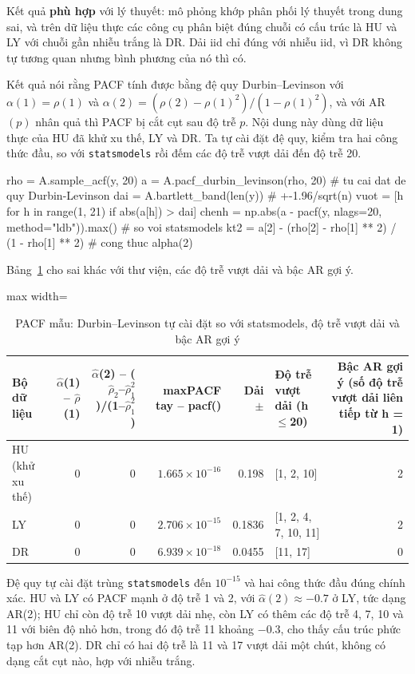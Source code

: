  Kết quả \textbf{phù hợp} với lý thuyết: mô phỏng khớp phân phối lý thuyết trong dung sai, và trên dữ liệu thực các công cụ phân biệt đúng chuỗi có cấu trúc là HU và LY với chuỗi gần nhiễu trắng là DR. Dải iid chỉ đúng với nhiễu iid, vì DR không tự tương quan nhưng bình phương của nó thì có.

 Kết quả  nói rằng PACF tính được bằng đệ quy Durbin--Levinson với $\alpha(1)=\rho(1)$ và $\alpha(2)=(\rho(2)-\rho(1)^2)/(1-\rho(1)^2)$, và với AR$(p)$ nhân quả thì PACF bị cắt cụt sau độ trễ $p$.
 Nội dung này dùng dữ liệu thực của HU đã khử xu thế, LY và DR. Ta tự cài đặt đệ quy, kiểm tra hai công thức đầu, so với \texttt{statsmodels} rồi đếm các độ trễ vượt dải đến độ trễ 20.
\begin{codeblock}
rho = A.sample_acf(y, 20)
a = A.pacf_durbin_levinson(rho, 20)            # tu cai dat de quy Durbin-Levinson
dai = A.bartlett_band(len(y))                  # +-1.96/sqrt(n)
vuot = [h for h in range(1, 21) if abs(a[h]) > dai]
chenh = np.abs(a - pacf(y, nlags=20, method="ldb")).max()    # so voi statsmodels
kt2 = a[2] - (rho[2] - rho[1] ** 2) / (1 - rho[1] ** 2)       # cong thuc alpha(2)
\end{codeblock}
 Bảng~\ref{tab:tab_b11_11_pacf} cho sai khác với thư viện, các độ trễ vượt dải và bậc AR gợi ý.
\begin{table}[H]
\centering\footnotesize
\caption{PACF mẫu: Durbin–Levinson tự cài đặt so với statsmodels, độ trễ vượt dải và bậc AR gợi ý}\label{tab:tab_b11_11_pacf}
\begin{adjustbox}{max width=\linewidth}
\begin{tabular}{|l|r|r|r|r|l|r|}
\toprule
Bộ dữ liệu & $\hat{\alpha}$(1) – $\hat{\rho}$(1) & $\hat{\alpha}$(2) – ($\hat{\rho}_{2}$–$\hat{\rho}_{1}^{2}$)/(1–$\hat{\rho}_{1}^{2}$) & max\textbar{}PACF tay – pacf()\textbar{} & Dải $\pm$ & Độ trễ vượt dải (h$\le$20) & Bậc AR gợi ý (số độ trễ vượt dải liên tiếp từ h = 1) \\
\midrule
HU (khử xu thế) & 0 & 0 & $1.665\times10^{-16}$ & 0.198 & [1, 2, 10] & 2 \\
LY & 0 & 0 & $2.706\times10^{-15}$ & 0.1836 & [1, 2, 4, 7, 10, 11] & 2 \\
DR & 0 & 0 & $6.939\times10^{-18}$ & 0.0455 & [11, 17] & 0 \\
\bottomrule
\end{tabular}
\end{adjustbox}
\end{table}
 Đệ quy tự cài đặt trùng \texttt{statsmodels} đến $10^{-15}$ và hai công thức đầu đúng chính xác. HU và LY có PACF mạnh ở độ trễ 1 và 2, với $\hat\alpha(2)\approx-0.7$ ở LY, tức dạng AR(2); HU chỉ còn độ trễ 10 vượt dải nhẹ, còn LY có thêm các độ trễ 4, 7, 10 và 11 với biên độ nhỏ hơn, trong đó độ trễ 11 khoảng $-0.3$, cho thấy cấu trúc phức tạp hơn AR(2). DR chỉ có hai độ trễ là 11 và 17 vượt dải một chút, không có dạng cắt cụt nào, hợp với nhiễu trắng.

